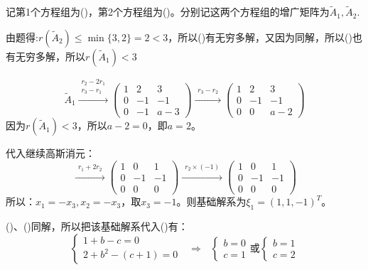 \documentclass[a4paper]{report}
\begin{document}
\begin{jie}
记第1个方程组为(\uppercase\expandafter{})，第2个方程组为(\uppercase\expandafter{})。分别记这两个方程组的增广矩阵为$\widetilde{A}_1,\widetilde{A}_2$.

由题得:$r(\widetilde{A}_2)\leq\min\{3,2\}=2<3$，所以(\uppercase\expandafter{})有无穷多解，又因为同解，所以(\uppercase\expandafter{})也有无穷多解，所以$r(\widetilde{A}_1)<3$

\begin{equation*}
\widetilde{A}_1\xrightarrow{\substack{r_2-2r_1\\ r_3-r_1}}
{\begin{pmatrix}
1&2&3\\
0&-1&-1\\
0&-1&a-3\end{pmatrix}
}\xrightarrow{\substack{r_3-r_2}}
{\begin{pmatrix}
1&2&3\\
0&-1&-1\\
0&0&a-2\end{pmatrix}
}
\end{equation*}
因为$r(\widetilde{A}_1)<3$，所以$a-2=0$，即$a=2$。

代入继续高斯消元：
\begin{equation*}
\xrightarrow{\substack{r_1+2r_2}}
{
\begin{pmatrix}
1&0&1\\
0&-1&-1\\
0&0&0
\end{pmatrix}
}\xrightarrow{\substack{r_2\times(-1)}}
{
\begin{pmatrix}
1&0&1\\
0&-1&-1\\
0&0&0
\end{pmatrix}
}
\end{equation*}
所以：$x_1=-x_3,x_2=-x_3$，取$x_3=-1$。则基础解系为$\xi_1=(1,1,-1)^T$。

(\uppercase\expandafter{})、(\uppercase\expandafter{})同解，所以把该基础解系代入(\uppercase\expandafter{})有：
\begin{equation*}
\begin{cases}
1+b-c=0\\
2+b^2-(c+1)=0
\end{cases}~~~\Rightarrow~~~
\begin{cases}
b=0\\
c=1
\end{cases}\text{或}
\begin{cases}
b=1\\
c=2
\end{cases}
\end{equation*}


\end{jie}
\end{document}
